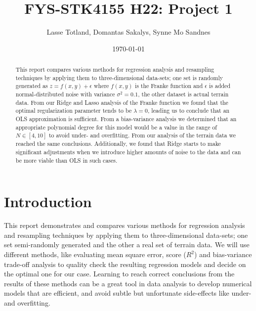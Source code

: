 \documentclass[reprint,english,notitlepage]{revtex4-1}  %
\begin{document}
\title{FYS-STK4155 H22: Project 1}
\author{Lasse Totland, Domantas Sakalys, Synne Mo Sandnes}
\date{\today}      %
\noaffiliation                            %
\begin{abstract} %
This report compares various methods for regression analysis and resampling techniques by applying them to three-dimensional data-sets; one set is randomly generated as $z = f(x,y) + \epsilon$ where $f(x,y)$ is the Franke function and $\epsilon$ is added normal-distributed noise with variance $\sigma^2 = 0.1$, the other dataset is actual terrain data. From our Ridge and Lasso analysis of the Franke function we found that the optimal regularization parameter tends to be $\lambda = 0$, leading us to conclude that an OLS approximation is sufficient. From a bias-variance analysis we determined that an appropriate polynomial degree for this model would be a value in the range of $N \in [4, 10]$ to avoid under- and overfitting. From our analysis of the terrain data we reached the same conclusions. Additionally, we found that Ridge starts to make significant adjustments when we introduce higher amounts of noise to the data and can be more viable than OLS in such cases.
\end{abstract}                            %
\maketitle                                %



\section{Introduction} 

This report demonstrates and compares various methods for regression analysis and resampling techniques by applying them to three-dimensional data-sets; one set semi-randomly generated and the other a real set of terrain data. We will use different methods, like evaluating mean square error, score ($R^2$) and bias-variance trade-off analysis to quality check the resulting regression models and decide on the optimal one for our case. Learning to reach correct conclusions from the results of these methods can be a great tool in data analysis to develop numerical models that are efficient, and avoid subtle but unfortunate side-effects like under- and overfitting.
\end{document}
